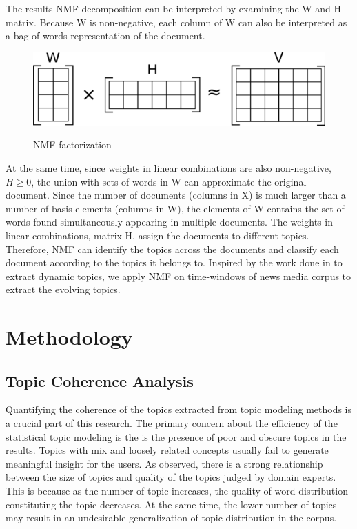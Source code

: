 The results NMF decomposition can be interpreted by examining the W and H matrix. Because W is non-negative, each column of W can also be interpreted as a bag-of-words representation of the document.

\begin{figure}[ht]
\centering
\includegraphics[scale=.7]{img/NMF}
\label{fig:NMF}
\caption{NMF factorization}
\end{figure}

 At the same time, since weights in linear combinations are also non-negative, $H \geq 0$, the union with sets of words in W can approximate the original document. Since the number of documents (columns in X) is much larger than a number of basis elements (columns in W), the elements of W contains the set of words found simultaneously appearing in multiple documents. The weights in linear combinations, matrix H, assign the documents to different topics. Therefore, NMF  can identify the topics across the documents and classify each document according to the topics it belongs to. Inspired by the work done in \cite{Greene2016} to extract dynamic topics, we apply NMF on time-windows of news media corpus to extract the evolving topics. 
 
 
\section{Methodology}

\subsection{Topic Coherence Analysis}
Quantifying the coherence of the topics extracted from topic modeling methods is a crucial part of this research. The primary concern about the efficiency of the statistical topic modeling is the is the presence of poor and obscure topics in the results.  Topics with mix and loosely related concepts usually fail to generate meaningful insight for the users. As  \cite{Mimno} observed, there is a strong relationship between the size of topics and quality of the topics judged by domain experts. This is because as the number of topic increases, the quality of word distribution constituting the topic decreases. At the same time, the lower number of topics may result in an undesirable generalization of topic distribution in the corpus.  

